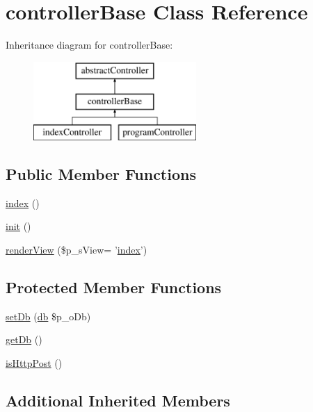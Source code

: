 \hypertarget{classcontroller_base}{\section{controller\-Base Class Reference}
\label{classcontroller_base}
}
Inheritance diagram for controller\-Base\-:\begin{figure}[H]
\begin{center}
\leavevmode
\includegraphics[height=3.000000cm]{classcontroller_base}
\end{center}
\end{figure}
\subsection*{Public Member Functions}
\begin{DoxyCompactItemize}
\item 
\hyperlink{classcontroller_base_a149eb92716c1084a935e04a8d95f7347}{index} ()
\item 
\hyperlink{classcontroller_base_a4be4055f3361d4800e16bc2e2e38cda6}{init} ()
\item 
\hyperlink{classcontroller_base_ac5e4cfad8999c9ab307b0eabded05722}{render\-View} (\$p\-\_\-s\-View= '\hyperlink{classcontroller_base_a149eb92716c1084a935e04a8d95f7347}{index}')
\end{DoxyCompactItemize}
\subsection*{Protected Member Functions}
\begin{DoxyCompactItemize}
\item 
\hyperlink{classcontroller_base_aa31bfdfbf8e089ed8054ff81aac51985}{set\-Db} (\hyperlink{classdb}{db} \$p\-\_\-o\-Db)
\item 
\hyperlink{classcontroller_base_aceb656ee5135578ab3a9947252caa772}{get\-Db} ()
\item 
\hyperlink{classcontroller_base_af1923f06f51143b20e3af00b02148c5d}{is\-Http\-Post} ()
\end{DoxyCompactItemize}
\subsection*{Additional Inherited Members}


